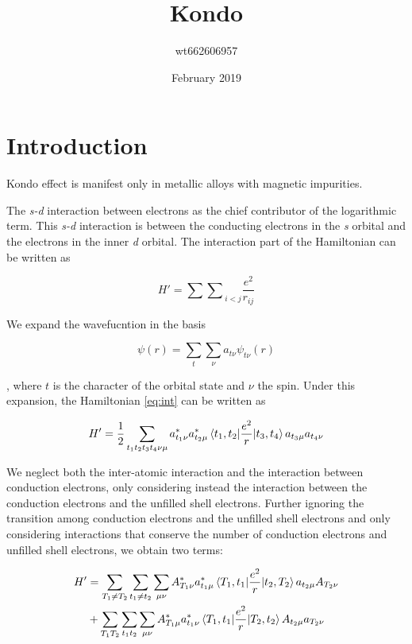 \documentclass{article}
\title{Kondo}
\author{wt662606957 }
\date{February 2019}
\begin{document}
\maketitle

\section{Introduction}


Kondo effect is manifest only in metallic alloys with magnetic impurities. 

The \textit{s-d} interaction between electrons as the chief contributor of the logarithmic term. This \textit{s-d} interaction is between the conducting electrons in the \textit{s} orbital and the electrons in the inner \textit{d} orbital. The interaction part of the Hamiltonian can be written as 

\begin{equation}\label{eq:int}
    H' = {\sum\sum}_{i<j} \frac{e^2}{r_{ij}}
\end{equation}

We expand the wavefucntion in the basis

\begin{equation}
    \psi(r) = \sum_{t}\sum_{\nu}a_{t\nu}\psi_{t\nu}(r)
\end{equation}

, where $t$ is the character of the orbital state and $\nu$ the spin. Under this expansion, the Hamiltonian \ref{eq:int} can be written as

\begin{equation}
    H' = \frac{1}{2}\sum_{t_1t_2t_3t_4\nu\mu}a_{t_1\nu}^* a_{t_2\mu}^* \braket{t_1, t_2| \frac{e^2}{r} | t_3,t_4} a_{t_3\mu} a_{t_4\nu}
\end{equation}

We neglect both the inter-atomic interaction and the interaction between conduction electrons, only considering instead the interaction between the conduction electrons and the unfilled shell electrons. Further ignoring the transition among conduction electrons and the unfilled shell electrons and only considering interactions that conserve the number of conduction electrons and unfilled shell electrons, we obtain two terms:


\begin{equation}
\begin{split}
H' &= \sum_{T_1 \ne T_2} \sum_{t_1 \ne t_2} \sum_{\mu \nu} A_{T_1 \nu}^* a_{t_1 \mu}^*  \braket{T_1, t_1| \frac{e^2}{r} | t_2,T_2} a_{t_2 \mu} A_{T_2 \nu} \\
&+ \sum_{T_1 T_2} \sum_{t_1 t_2} \sum_{\mu \nu} A_{T_1 \mu}^* a_{t_1 \nu}^*  \braket{T_1, t_1| \frac{e^2}{r} | T_2,t_2} A_{t_2 \mu} a_{T_2 \nu}
\end{split}
\end{equation}
\end{document}
